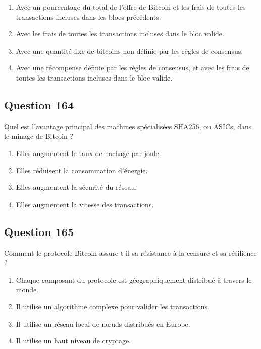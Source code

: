 \documentclass[12pt,a4paper]{article}
\begin{document}
\begin{enumerate}[label=\Alph*., leftmargin=*]
\item Avec un pourcentage du total de l'offre de Bitcoin et les frais de toutes les transactions incluses dans les blocs précédents.
\item Avec les frais de toutes les transactions incluses dans le bloc valide.
\item Avec une quantité fixe de bitcoins non définie par les règles de consensus.
\item Avec une récompense définie par les règles de consensus, et avec les frais de toutes les transactions incluses dans le bloc valide.
\end{enumerate}

\bigskip


\subsection*{Question 164}
Quel est l'avantage principal des machines spécialisées SHA256, ou ASICs, dans le minage de Bitcoin ?

\begin{enumerate}[label=\Alph*., leftmargin=*]
\item Elles augmentent le taux de hachage par joule.
\item Elles réduisent la consommation d'énergie.
\item Elles augmentent la sécurité du réseau.
\item Elles augmentent la vitesse des transactions.
\end{enumerate}

\bigskip


\subsection*{Question 165}
Comment le protocole Bitcoin assure-t-il sa résistance à la censure et sa résilience ?

\begin{enumerate}[label=\Alph*., leftmargin=*]
\item Chaque composant du protocole est géographiquement distribué à travers le monde.
\item Il utilise un algorithme complexe pour valider les transactions.
\item Il utilise un réseau local de nœuds distribués en Europe.
\item Il utilise un haut niveau de cryptage.
\end{enumerate}
\end{document}
